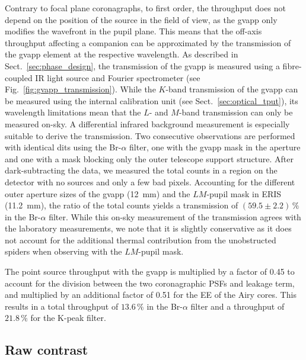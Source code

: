 \documentclass{aa}
\begin{document}
Contrary to focal plane coronagraphs, to first order, the throughput does not depend on the position of the source in the field of view, as the \ac{gvapp} only modifies the wavefront in the pupil plane.
%
This means that the off-axis throughput affecting a companion can be approximated by the transmission of the \ac{gvapp} element at the respective wavelength.
%
As described in Sect.~\ref{sec:phase_design}, the transmission of the \ac{gvapp} is measured using a fibre-coupled IR light source and Fourier spectrometer (see Fig.~\ref{fig:gvapp_transmission}).
%
While the $K$-band transmission of the \ac{gvapp} can be measured using the internal calibration unit (see Sect.~\ref{sec:optical_tput}), its wavelength limitations mean that the $L$- and $M$-band transmission can only be measured on-sky.
%
A differential infrared background measurement is especially suitable to derive the transmission.
%
Two consecutive observations are performed with identical \acp{dit} using the Br-$\alpha$ filter, one with the \ac{gvapp} mask in the aperture and one with a mask blocking only the outer telescope support structure.
%
After dark-subtracting the data, we measured the total counts in a region on the detector with no sources and only a few bad pixels.
%
Accounting for the different outer aperture sizes of the \ac{gvapp} (12~mm) and the $LM$-pupil mask in ERIS (11.2~mm), the ratio of the total counts yields a transmission of $(59.5 \pm 2.2)\, \%$ in the Br-$\alpha$ filter.
%
While this on-sky measurement of the transmission agrees with the laboratory measurements, we note that it is slightly conservative as it does not account for the additional thermal contribution from the unobstructed spiders when observing with the $LM$-pupil mask.

The point source throughput with the \ac{gvapp} is multiplied by a  factor of 0.45 to account for the division between the two coronagraphic PSFs and leakage term, and multiplied by an additional factor of 0.51 for the EE of the Airy cores.
This results in a total throughput of $13.6\, \%$ in the Br-$\alpha$ filter and a throughput of $21.8\, \%$ for the K-peak filter.

\subsection{Raw contrast}
\end{document}
